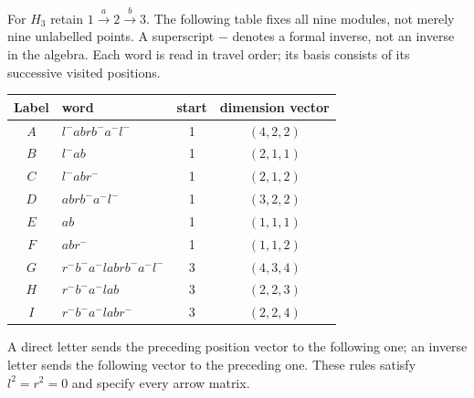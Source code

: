 \documentclass[11pt,oneside,openany]{book}
\theoremstyle{definition}\newtheorem{definition}[theorem]{Definition}
\theoremstyle{remark}\newtheorem{remark}[theorem]{Remark}
\begin{document}
For $H_3$ retain $1\xrightarrow a2\xrightarrow b3$. The following table fixes
all nine modules, not merely nine unlabelled points. A superscript $-$ denotes
a formal inverse, not an inverse in the algebra. Each word is read in travel
order; its basis consists of its successive visited positions.
\begin{center}\small
\begin{tabular}{c l c c}
\toprule Label&word&start&dimension vector\\\midrule
$A$&$l^-abrb^-a^-l^-$&1&$(4,2,2)$\\
$B$&$l^-ab$&1&$(2,1,1)$\\
$C$&$l^-abr^-$&1&$(2,1,2)$\\
$D$&$abrb^-a^-l^-$&1&$(3,2,2)$\\
$E$&$ab$&1&$(1,1,1)$\\
$F$&$abr^-$&1&$(1,1,2)$\\
$G$&$r^-b^-a^-labrb^-a^-l^-$&3&$(4,3,4)$\\
$H$&$r^-b^-a^-lab$&3&$(2,2,3)$\\
$I$&$r^-b^-a^-labr^-$&3&$(2,2,4)$\\\bottomrule
\end{tabular}
\end{center}
A direct letter sends the preceding position vector to the following one;
an inverse letter sends the following vector to the preceding one. These rules
satisfy $l^2=r^2=0$ and specify every arrow matrix.
\end{document}

